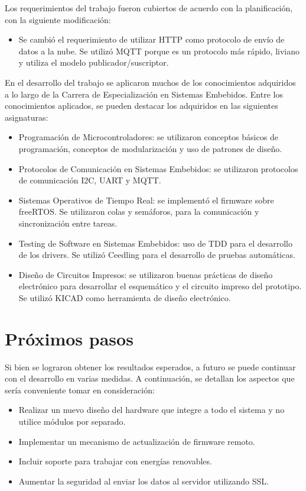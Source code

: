 Los requerimientos del trabajo fueron cubiertos de acuerdo con la planificación, con la siguiente modificación:

\begin{itemize}
    \item Se cambió el requerimiento de utilizar HTTP como protocolo de envío de datos a la nube. Se utilizó MQTT porque es un protocolo más rápido, liviano y utiliza el modelo publicador/suscriptor.
\end{itemize}

En el desarrollo del trabajo se aplicaron muchos de los conocimientos adquiridos a lo largo de la Carrera de Especialización en Sistemas Embebidos. Entre los conocimientos aplicados, se pueden destacar los adquiridos en las siguientes asignaturas:

\begin{itemize}
    \item Programación de Microcontroladores: se utilizaron conceptos básicos de programación, conceptos de modularización y uso de patrones de diseño. 
    \item Protocolos de Comunicación en Sistemas Embebidos: se utilizaron protocolos de comunicación I2C, UART y MQTT.
    \item Sistemas Operativos de Tiempo Real: se implementó el firmware sobre freeRTOS. Se utilizaron colas y semáforos, para la comunicación y sincronización entre tareas.    
    \item Testing de Software en Sistemas Embebidos: uso de TDD para el desarrollo de los drivers. Se utilizó Ceedling para el desarrollo de pruebas automáticas.
    \item Diseño de Circuitos Impresos: se utilizaron buenas prácticas de diseño electrónico para desarrollar el esquemático y el circuito impreso del prototipo. Se utilizó KICAD como herramienta de diseño electrónico.
\end{itemize}

\section{Próximos pasos}

Si bien se lograron obtener los resultados esperados, a futuro se puede continuar
con el desarrollo en varias medidas. A continuación, se detallan los aspectos que sería conveniente tomar en consideración:
\begin{itemize}
    \item Realizar un nuevo diseño del hardware que integre a todo el sistema y no utilice módulos por separado.
    \item Implementar un mecanismo de actualización de firmware remoto.
    \item Incluir soporte para trabajar con energías renovables.
    \item Aumentar la seguridad al enviar los datos al servidor utilizando SSL.
\end{itemize}